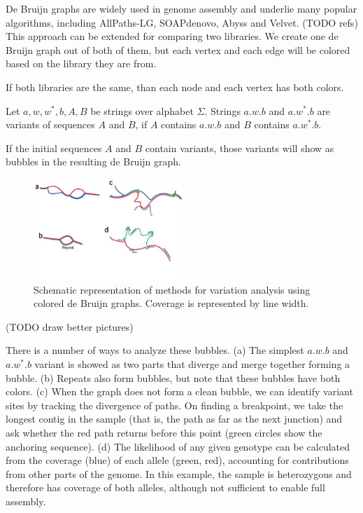 De Bruijn graphs are widely used in genome assembly and underlie many popular algorithms, including AllPaths-LG, SOAPdenovo, Abyss and Velvet. (TODO refs)
This approach can be extended for comparing two libraries. 
We create one de Bruijn graph out of both of them, but each vertex and each edge will be colored based on the library they are from.

If both libraries are the same, than each node and each vertex has both colors. 

\begin{definicia}[variant] \label{def:variant}
Let $a,w,w^*,b, A, B$ be strings over alphabet $\Sigma$.
Strings $a.w.b$ and $a.w^*.b$ are variants of sequences $A$ and $B$, 
if $A$ contains $a.w.b$ and $B$ contains $a.w^*.b$.
\end{definicia}

If the initial sequences $A$ and $B$ contain variants, 
those variants will show as bubbles\cite{iqbal2012novo} in the resulting de Bruijn graph.

\begin{figure}[h]
    \centering
    \includegraphics[width=0.5\textwidth]{images/coloreddebruijn}
    \caption{Schematic representation of methods for variation analysis using colored de Bruijn graphs. 
    Coverage is represented by line width.}
    \label{fig:mesh1}
\end{figure}

(TODO draw better pictures)

There is a number of ways to analyze these bubbles.
(a) The simplest $a.w.b$ and $a.w^*.b$ variant is showed as two parts that diverge and merge together forming a bubble.
(b) Repeats also form bubbles, but note that these bubbles have both colors.
(c) When the graph does not form a clean bubble, we can identify variant sites by tracking the divergence of paths.
On finding a breakpoint, we take the longest contig in the sample (that is, the path as far as the next junction) and ask whether the red path returns before this point (green circles show the anchoring sequence).
(d) The likelihood of any given genotype can be calculated from the coverage (blue) of each allele (green, red), accounting for contributions from other parts of the genome. In this example, the sample is heterozygous and therefore has coverage of both alleles, although not sufficient to enable full assembly.

